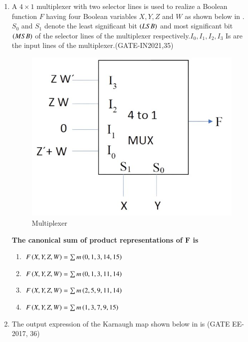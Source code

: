\begin{enumerate}[label=\arabic*.,ref=\theenumi]
\item A $ 4\times1$ multiplexer with two selector lines is used to realize a Boolean function $F$ having four Boolean variables $X, Y, Z$ and $W$ as shown below
in  .
	 $S_0$ and $S_1$ denote the least significant bit $\left(LSB\right)$ and most significant bit $\left(MSB\right)$ of the selector lines of the multiplexer respectively.$I_0, I_1, I_2,I_3$ Is are the input lines of the multiplexer.\hfill(GATE-IN2021,35)
  \begin{figure}[H]
  \centering
  \includegraphics[width=0.5\columnwidth]{figs/kmapsmall.jpg}
  \caption{Multiplexer}
  \label{fig:multiplexerwithtwoselectionliness}
\end{figure}
\textbf{The canonical sum of product representations of $\textbf{F}$ is} 
 \begin{enumerate}
        \item  $F\left(X,Y,Z,W\right) = \sum m \left(0,1,3,14,15\right)$
        \item  $F\left(X,Y,Z,W\right) = \sum m \left(0,1,3,11,14\right)$
        \item  $F\left(X,Y,Z,W\right) = \sum m \left(2,5,9,11,14\right)$
        \item  $F\left(X,Y,Z,W\right) = \sum m \left(1,3,7,9,15\right)$
    \end{enumerate}

\item The output expression of the Karnaugh map shown below in
is
				\hfill(GATE EE-2017, 36)


\end{enumerate}
